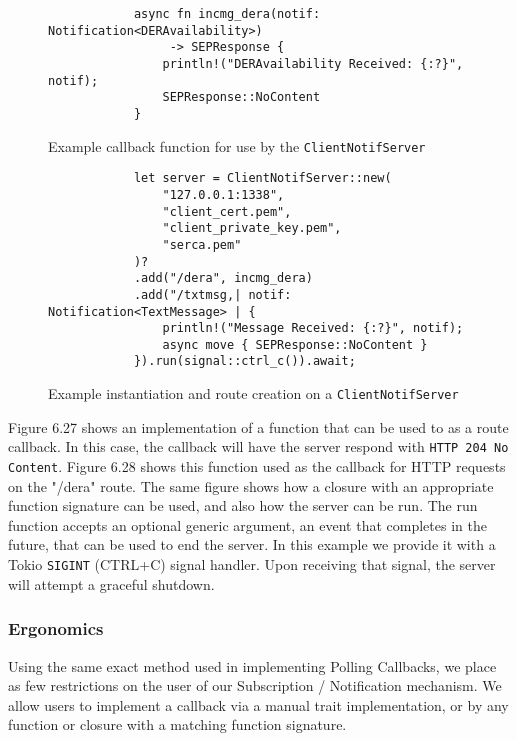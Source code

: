 \begin{figure}[h]
    \begin{center}
        \begin{lstlisting}
            async fn incmg_dera(notif: Notification<DERAvailability>)
                 -> SEPResponse {
                println!("DERAvailability Received: {:?}", notif);
                SEPResponse::NoContent
            }
        \end{lstlisting}
        \label{fig:notiffn}
        \vspace{-10pt}
        \caption{Example callback function for use by the \texttt{ClientNotifServer}}
    \end{center}
\end{figure}

\begin{figure}[h]
    \begin{center}
        \begin{lstlisting}
            let server = ClientNotifServer::new(
                "127.0.0.1:1338",
                "client_cert.pem",
                "client_private_key.pem",
                "serca.pem"
            )?
            .add("/dera", incmg_dera)
            .add("/txtmsg,| notif: Notification<TextMessage> | {
                println!("Message Received: {:?}", notif);
                async move { SEPResponse::NoContent }
            }).run(signal::ctrl_c()).await;
        \end{lstlisting}
        \label{fig:notifroutes}
        \vspace{-10pt}
        \caption{Example instantiation and route creation on a \texttt{ClientNotifServer}}
    \end{center}
\end{figure}

Figure 6.27 shows an implementation of a function that can be used to as a route callback. In this case, the callback will have the server respond with \texttt{HTTP 204 No Content}. Figure 6.28 shows this function used as the callback for HTTP requests on the "/dera" route. The same figure shows how a closure with an appropriate function signature can be used, and also how the server can be run. 
The run function accepts an optional generic argument, an event that completes in the future, that can be used to end the server. In this example we provide it with a Tokio \texttt{SIGINT} (CTRL+C) signal handler. Upon receiving that signal, the server will attempt a graceful shutdown.

\subsubsection{Ergonomics}
Using the same exact method used in implementing Polling Callbacks, we place as few restrictions on the user of our Subscription / Notification mechanism. We allow users to implement a callback via a manual trait implementation, or by any function or closure with a matching function signature.

